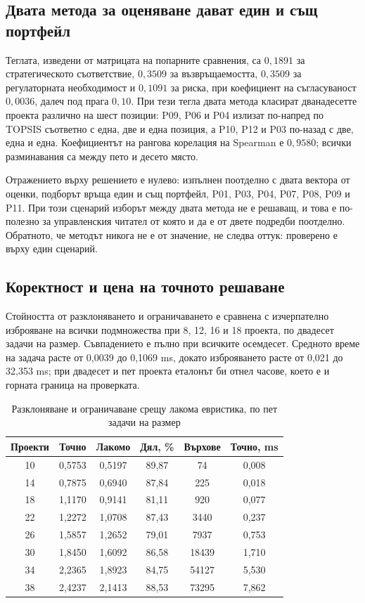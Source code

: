 \subsection{Двата метода за оценяване дават един и същ портфейл}

Теглата, изведени от матрицата на попарните сравнения, са $0{,}1891$ за
стратегическото съответствие, $0{,}3509$ за възвръщаемостта, $0{,}3509$ за
регулаторната необходимост и $0{,}1091$ за риска, при коефициент на съгласуваност
$0{,}0036$, далеч под прага $0{,}10$. При тези тегла двата метода класират
дванадесетте проекта различно на шест позиции: P09, P06 и P04 излизат по-напред
по TOPSIS съответно с една, две и една позиция, а P10, P12 и P03 по-назад с две,
една и една. Коефициентът на рангова корелация на Spearman е $0{,}9580$; всички
разминавания са между пето и десето място.

Отражението върху решението е нулево: изпълнен поотделно с двата вектора от
оценки, подборът връща един и същ портфейл, P01, P03, P04, P07, P08, P09 и P11.
При този сценарий изборът между двата метода не е решаващ, и това е по-полезно за
управленския читател от която и да е от двете подредби поотделно. Обратното, че
методът никога не е от значение, не следва оттук: проверено е върху един сценарий.

\subsection{Коректност и цена на точното решаване}

Стойността от разклоняването и ограничаването е сравнена с изчерпателно изброяване
на всички подмножества при 8, 12, 16 и 18 проекта, по двадесет задачи на размер.
Съвпадението е пълно при всичките осемдесет. Средното време на задача расте от
0,0039 до 0,1069 ms, докато изброяването расте от 0,021 до 32,353 ms; при двадесет
и пет проекта еталонът би отнел часове, което е и горната граница на проверката.

\begin{table}[H]
\centering
\caption{Разклоняване и ограничаване срещу лакома евристика, по пет задачи на размер}
\label{tab:exact-greedy}
\small
\begin{tabular}{@{}cccccc@{}}
\toprule
\textbf{Проекти} & \textbf{Точно} & \textbf{Лакомо} & \textbf{Дял, \%} & \textbf{Върхове} & \textbf{Точно, ms} \\
\midrule
10 & 0,5753 & 0,5197 & 89,87 & 74     & 0,008 \\
14 & 0,7875 & 0,6940 & 87,84 & 225    & 0,018 \\
18 & 1,1170 & 0,9141 & 81,11 & 920    & 0,077 \\
22 & 1,2272 & 1,0708 & 87,43 & 3440   & 0,237 \\
26 & 1,5857 & 1,2652 & 79,01 & 7937   & 0,753 \\
30 & 1,8450 & 1,6092 & 86,58 & 18439  & 1,710 \\
34 & 2,2365 & 1,8923 & 84,75 & 54127  & 5,530 \\
38 & 2,4237 & 2,1413 & 88,53 & 73295  & 7,862 \\
\bottomrule
\end{tabular}
\end{table}

